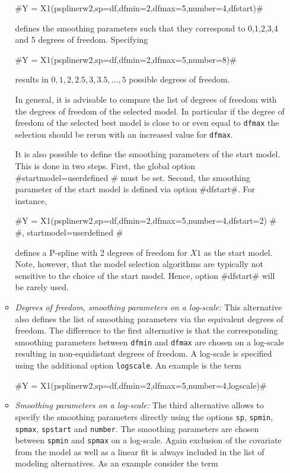 \begin{itemize}
\begin{itemize}
#Y = X1(psplinerw2,sp=df,dfmin=2,dfmax=5,number=4,dfstart)#

defines the smoothing parameters such that they correspond to 0,1,2,3,4 and 5 degrees of freedom. Specifying

#Y = X1(psplinerw2,sp=df,dfmin=2,dfmax=5,number=8)#

results in $0,1,2,2.5,3,3.5,\dots,5$ possible degrees of freedom.

In general, it is advisable to compare the list of degrees of freedom with the degrees of freedom of the selected model. In particular if the
degree of freedom of the selected best model is close to or even equal to {\tt dfmax} the selection should be rerun with an increased
value for {\tt dfmax}.

It is also possible to define the smoothing parameters of the start model.
This is done in two steps. First, the global option #startmodel=userdefined # must be set. Second, the smoothing parameter
of the  start model is defined via option #dfstart#. For instance,

#Y = X1(psplinerw2,sp=df,dfmin=2,dfmax=5,number=4,dfstart=2) # \\
#, startmodel=userdefined #

defines a P-spline with 2 degrees of freedom for $X1$ as the start model. Note, however, that the model selection algorithms are
typically not sensitive to the choice of the start model. Hence, option #dfstart# will be rarely used.

\item {\em Degrees of freedom, smoothing parameters on a log-scale:}
This alternative  also defines the list of smoothing parameters via the equivalent degrees of freedom. The difference to the
first alternative is that the corresponding smoothing parameters between {\tt dfmin} and {\tt dfmax}  are chosen on a log-scale resulting
in non-equidistant degrees of freedom. A log-scale is specified using the additional option {\tt logscale}. An example is the term

#Y = X1(psplinerw2,sp=df,dfmin=2,dfmax=5,number=4,logscale)#

\item {\em Smoothing parameters on a log-scale:}
The third alternative allows to specify the smoothing parameters directly using the options {\tt sp}, {\tt spmin}, {\tt spmax}, {\tt spstart}
and {\tt number}. The smoothing parameters are chosen between {\tt spmin} and {\tt spmax} on a log-scale. Again exclusion of the covariate from the
model as well as a linear fit is always included in the list of modeling alternatives. As an example consider the term


\end{itemize}
\end{itemize}
